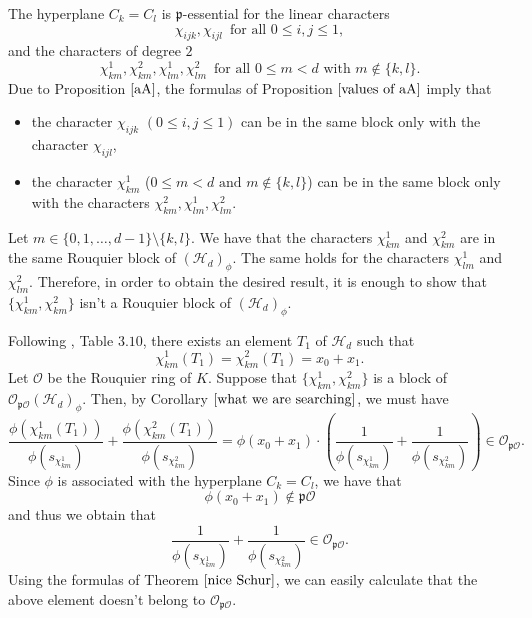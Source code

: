 \documentclass[10pt,a4paper,titlepage]{article}
\begin{document}
\begin{apod}
{\begin{enumerate}[(1)]
The hyperplane $C_k=C_l$ is $\mathfrak{p}$-essential for the linear characters
$$ \chi_{ijk},\chi_{ijl}\, \textrm{ for all } 0 \leq i,j \leq 1,$$
and the characters of degree $2$
$$\chi_{km}^{1},\chi_{km}^{2},\chi_{lm}^{1},\chi_{lm}^{2}\, \textrm{ for all } 0 \leq m <d \textrm{ with } m \notin \{k,l\}.$$
Due to Proposition $\ref{aA}$, the  formulas of Proposition $\ref{values of aA}$ imply that 
\begin{itemize}
\item the character $\chi_{ijk}$ $(0 \leq i,j\leq 1)$ can be in the same block only with the character $\chi_{ijl}$,
\item the character $\chi_{km}^{1}$ ($ 0 \leq m <d \textrm{ and } m \notin \{k,l\}$) can be in the same block only with the characters $\chi_{km}^{2},\chi_{lm}^{1},\chi_{lm}^{2}$.
\end{itemize}
Let $m \in \{0,1,\ldots,d-1\}\setminus \{k,l\}$. We have that the characters $\chi_{km}^{1}$ and $\chi_{km}^{2}$ are in the same Rouquier block of $(\mathcal{H}_d)_\phi$. The same holds for the characters $\chi_{lm}^{1}$ and $\chi_{lm}^{2}$. Therefore, in order to obtain the desired result, it is enough to show that 
$\{\chi_{km}^{1},\chi_{km}^{2}\}$ isn't a Rouquier block of $(\mathcal{H}_d)_\phi$.

Following \cite{Ma2}, Table $3.10$, there exists an element $T_1$ of $\mathcal{H}_d$ such that
$$\chi_{km}^1(T_1)=\chi_{km}^2(T_1)=x_0+x_1.$$
Let $\mathcal{O}$ be the Rouquier ring of $K$. Suppose that $\{\chi_{km}^{1},\chi_{km}^{2}\}$ is a block of $\mathcal{O}_{\mathfrak{p}\mathcal{O}}(\mathcal{H}_d)_\phi$. Then, by Corollary $\ref{what we are searching}$, we must have
$$\frac{\phi(\chi_{km}^1(T_1))}{\phi(s_{\chi_{km}^1})}+\frac{\phi(\chi_{km}^2(T_1))}{\phi(s_{\chi_{km}^2})}= \phi(x_0+x_1) \cdot \left(\frac{1}{\phi(s_{\chi_{km}^{1}})}+\frac{1}{\phi(s_{\chi_{km}^{2}})}\right) \in \mathcal{O}_{\mathfrak{p}\mathcal{O}}.$$
Since $\phi$ is associated with the hyperplane $C_k=C_l$, we have that $$\phi(x_0+x_1) \notin \mathfrak{p}\mathcal{O}$$ and thus we obtain that
$$\frac{1}{\phi(s_{\chi_{km}^{1}})}+\frac{1}{\phi(s_{\chi_{km}^{2}})} \in \mathcal{O}_{\mathfrak{p}\mathcal{O}}.$$
Using the formulas of Theorem $\ref{nice Schur}$, we can easily calculate that the above element doesn't belong to $\mathcal{O}_{\mathfrak{p}\mathcal{O}}.$


\end{enumerate}}
\end{apod}
\end{document}
